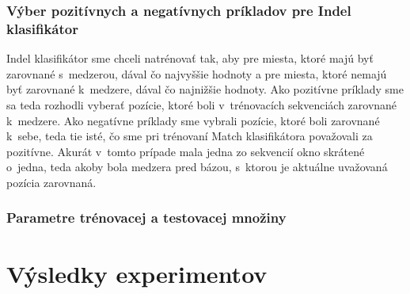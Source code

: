 \subsubsection{Výber pozitívnych a negatívnych príkladov pre Indel klasifikátor}

Indel klasifikátor sme chceli natrénovať tak, aby pre miesta, ktoré majú byť zarovnané s~medzerou, dával čo najvyššie hodnoty a pre miesta, ktoré nemajú byť zarovnané k~medzere, dával čo najnižšie hodnoty. Ako pozitívne príklady sme sa teda rozhodli vyberať pozície, ktoré boli v~trénovacích sekvenciách zarovnané k~medzere. Ako negatívne príklady sme vybrali pozície, ktoré boli zarovnané k~sebe, teda tie isté, čo sme pri trénovaní Match klasifikátora považovali za pozitívne. Akurát v~tomto prípade mala jedna zo sekvencií okno skrátené o~jedna, teda akoby bola medzera pred bázou, s~ktorou je aktuálne uvažovaná pozícia zarovnaná.

\subsubsection{Parametre trénovacej a testovacej množiny}

\todo

\section{Výsledky experimentov}


